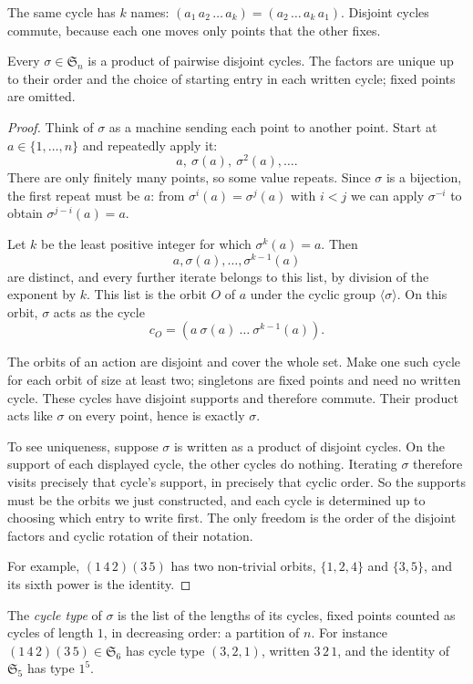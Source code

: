 The same cycle has $k$ names: $(a_1\,a_2\,\dots\,a_k)=(a_2\,\dots\,a_k\,a_1)$. Disjoint cycles commute, because each one moves only points that the other fixes.

\begin{proposition}\label{prop:cycles}
Every $\sigma\in\mathfrak S_n$ is a product of pairwise disjoint cycles. The factors are unique up to their order and the choice of starting entry in each written cycle; fixed points are omitted.
\end{proposition}
\begin{proof}
Think of $\sigma$ as a machine sending each point to another
point. Start at $a\in\{1,\ldots,n\}$ and repeatedly apply it:
\[
a,\ \sigma(a),\ \sigma^2(a),\ldots.
\]
There are only finitely many points, so some value repeats.
Since $\sigma$ is a bijection, the first repeat must be $a$:
from $\sigma^i(a)=\sigma^j(a)$ with $i<j$ we can apply
$\sigma^{-i}$ to obtain $\sigma^{j-i}(a)=a$.

Let $k$ be the least positive integer for which
$\sigma^k(a)=a$. Then
\[
a,\sigma(a),\ldots,\sigma^{k-1}(a)
\]
are distinct, and every further iterate belongs to this list,
by division of the exponent by $k$. This list is the orbit
$O$ of $a$ under the cyclic group $\langle\sigma\rangle$.
On this orbit, $\sigma$ acts as the cycle
\[
c_O=(a\ \sigma(a)\ \ldots\ \sigma^{k-1}(a)).
\]

The orbits of an action are disjoint and cover the whole set.
Make one such cycle for each orbit of size at least two;
singletons are fixed points and need no written cycle.
These cycles have disjoint supports and therefore commute.
Their product acts like $\sigma$ on every point, hence is
exactly $\sigma$.

To see uniqueness, suppose $\sigma$ is written as a product
of disjoint cycles. On the support of each displayed cycle,
the other cycles do nothing. Iterating $\sigma$ therefore
visits precisely that cycle's support, in precisely that
cyclic order. So the supports must be the orbits we just
constructed, and each cycle is determined up to choosing
which entry to write first. The only freedom is the order
of the disjoint factors and cyclic rotation of their notation.

For example, $(1\,4\,2)(3\,5)$ has two non-trivial orbits,
$\{1,2,4\}$ and $\{3,5\}$, and its sixth power is the identity.
\end{proof}

The \emph{cycle type} of $\sigma$ is the list of the lengths of its cycles, fixed points counted as cycles of length $1$, in decreasing order: a partition of $n$. For instance $(1\,4\,2)(3\,5)\in\mathfrak S_6$ has cycle type $(3,2,1)$, written $3\,2\,1$, and the identity of $\mathfrak S_5$ has type $1^5$.

